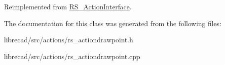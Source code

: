 Reimplemented from \hyperlink{classRS__ActionInterface_af1a8d898a8bf0521295d7c45d80e6d09}{R\-S\-\_\-\-Action\-Interface}.



The documentation for this class was generated from the following files\-:\begin{DoxyCompactItemize}
\item 
librecad/src/actions/rs\-\_\-actiondrawpoint.\-h\item 
librecad/src/actions/rs\-\_\-actiondrawpoint.\-cpp\end{DoxyCompactItemize}
